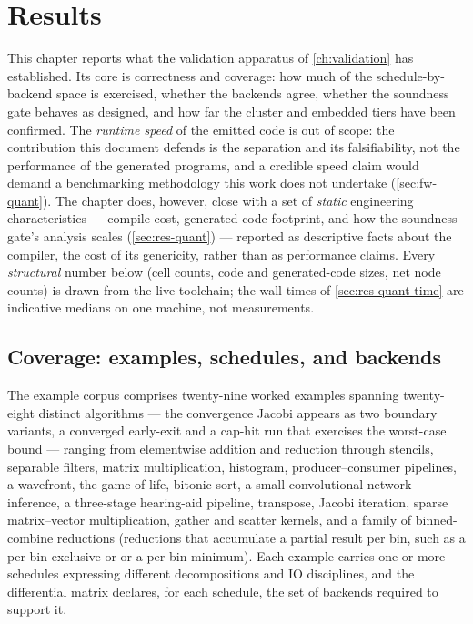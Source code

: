 \chapter{Results}\label{ch:results}

This chapter reports what the validation apparatus of \cref{ch:validation} has
established. Its core is correctness and coverage: how much of the
schedule-by-backend space is exercised, whether the backends agree, whether the
soundness gate behaves as designed, and how far the cluster and embedded tiers
have been confirmed. The \emph{runtime speed} of the emitted code is out of scope:
the contribution this document defends is the separation and its falsifiability,
not the performance of the generated programs, and a credible speed claim would
demand a benchmarking methodology this work does not undertake (\cref{sec:fw-quant}).
The chapter does, however, close with a set of \emph{static} engineering
characteristics --- compile cost, generated-code footprint, and how the soundness
gate's analysis scales (\cref{sec:res-quant}) --- reported as descriptive facts
about the compiler, the cost of its genericity, rather than as performance claims.
Every \emph{structural} number below (cell counts, code and generated-code sizes,
net node counts) is drawn from the live toolchain; the wall-times of
\cref{sec:res-quant-time} are indicative medians on one machine, not measurements.

\section{Coverage: examples, schedules, and backends}\label{sec:res-coverage}

The example corpus comprises twenty-nine worked examples spanning twenty-eight
distinct algorithms --- the convergence Jacobi appears as two boundary variants, a
converged early-exit and a cap-hit run that exercises the worst-case bound ---
ranging from
elementwise addition and reduction through stencils, separable filters, matrix
multiplication, histogram, producer--consumer pipelines, a wavefront, the game of
life, bitonic sort, a small convolutional-network inference, a three-stage
hearing-aid pipeline, transpose, Jacobi iteration, sparse matrix--vector
multiplication, gather and scatter kernels, and a family of binned-combine
reductions (reductions that accumulate a partial result per bin, such as a per-bin
exclusive-or or a per-bin minimum). Each example carries one or more schedules expressing different
decompositions and IO disciplines, and the differential matrix declares, for each
schedule, the set of backends required to support it.

